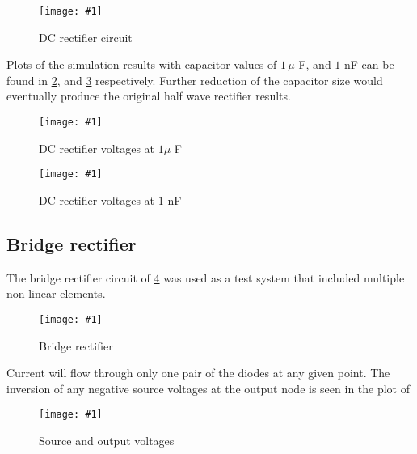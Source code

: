 \documentclass[12pt,journal,compsoc]{../ieeepaper/IEEEtran}
\newcommand{\imageFigureHere}[4]{%
\begin{figure}[!h]%
\centering%
\texttt{[image: \#1]}%
\caption{#2}%
\label{#3}%
\end{figure}%
}
\begin{document}
\imageFigureHere{../../figures/ece1254/report/typicalRectifierCircuitFig1}{DC rectifier circuit}{fig:typicalRectifierCircuitFig1}{4.0in}

Plots of the simulation results with 
capacitor values of \( 1 \, \mu \) F, and \( 1 \) nF can be found in
\cref{fig:typicalRectifierCircuitFig3}, and 
\cref{fig:typicalRectifierCircuitFig4} respectively.  Further reduction of the capacitor size would eventually produce the original half wave rectifier results.

\imageFigureHere{../../figures/ece1254/report/typicalRectifierCircuitSourceAndOutputVoltagesFig2}{DC rectifier voltages at \( 1 \mu \) F}{fig:typicalRectifierCircuitFig3}{3.0in}
\imageFigureHere{../../figures/ece1254/report/typicalRectifierCircuitSmallerCapSourceAndOutputVoltagesFig2}{DC rectifier voltages at \( 1 \) nF}{fig:typicalRectifierCircuitFig4}{3.0in}

\subsection{Bridge rectifier}

The 
bridge rectifier circuit of 
\cref{fig:bridgeRectifierCircuitDiagramFig1} 
was used as a test system that included multiple non-linear elements.

\imageFigureHere{../../figures/ece1254/report/bridgeRectifierCircuitDiagramFig1}{Bridge rectifier}{fig:bridgeRectifierCircuitDiagramFig1}{3.0in}

Current will flow through only one pair of the diodes at any given point.  The inversion of any negative source voltages at the output node is seen in the plot of 

\imageFigureHere{../../figures/ece1254/report/bridgeRectifierOutputVoltageFig2}{Source and output voltages}{fig:bridgeRectifierFig2}{3.0in}

\end{document}
